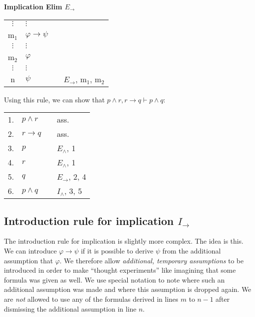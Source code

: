 \documentclass[nobib,nofonts]{tufte-handout}
\begin{document}
\bigskip
\noindent \colorbox{mygray!60}{\centering
  \begin{minipage}[t]{0.35\linewidth}
    \textbf{Implication Elim $E_{\rightarrow}$}
  \end{minipage}
  \begin{minipage}[t]{0.55\linewidth}
    \begin{tabular}{clcl}
      $\vdots$ & $\vdots$                   & \\
      m$_{1}$  & $\varphi \rightarrow \psi$ &  \\
      $\vdots$ & $\vdots$                   & \\
      m$_{2}$  & $\varphi$                  &  \\
      $\vdots$ & $\vdots$                   & \\
      n        & $\psi$                     & & $E_{\rightarrow}$, m$_{1}$, m$_{2}$
    \end{tabular}
  \end{minipage}
}
\bigskip

Using this rule, we can show that $p \wedge r, r \rightarrow q \vdash p \wedge q$:

\begin{tabular}{clcl}
  1. & $p \wedge r$      & & ass. \\
  2. & $r \rightarrow q$ & & ass.  \\
  3. & $p$               & & $E_{\wedge}$, 1  \\
  4. & $r$               & & $E_{\wedge}$, 1  \\
  5. & $q$               & & $E_{\rightarrow}$, 2, 4 \\
  6. & $p \wedge q$      & & $I_{\wedge}$, 3, 5
\end{tabular}

\subsection{Introduction rule for implication $I_{\rightarrow}$}

The introduction rule for implication is slightly more complex.
The idea is this.
We can introduce $\varphi \rightarrow \psi$ if it is possible to derive $\psi$ from the additional assumption that $\varphi$.
We therefore allow \emph{additional, temporary assumptions} to be introduced in order to make ``thought experiments'' like imagining that some formula was given as well.
We use special notation to note where such an additional assumption was made and where this assumption is dropped again.
We are \emph{not} allowed to use any of the formulas derived in lines $m$ to $n-1$ after dismissing the additional assumption in line $n$.
\end{document}
